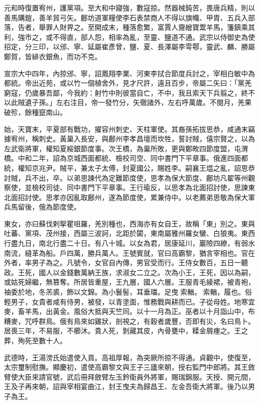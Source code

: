 \begin{pinyinscope}
 元和時復置宥州，護黨項。至大和中寢強，數寇掠。然器械鈍苦，畏唐兵精，則以善馬購鎧，善羊貿弓矢。鄜坊道軍糧使李石表禁商人不得以旗幟、甲胄、五兵入部落，告者，舉罪人財畀之。至開成末，種落愈繁，富賈人齎繒寶鬻羊馬，籓鎮乘其利，強市之，或不得直，部人怨，相率為亂，至靈、鹽道不通。武宗以侍御史為使招定，分三印，以邠、寧、延屬崔彥曾，鹽、夏、長澤屬李雩鄠，靈武、麟、勝屬鄭賀，皆緋衣銀魚，而功不克。



 宣宗大中四年，內掠邠、寧，詔鳳翔李業、河東李拭合節度兵討之，宰相白敏中為都統。帝出近苑，或以竹一個植舍外，見才尺許，遠且百步，帝屬二矢曰：「黨羌窮寇，仍歲暴吾鄙，今我約：射竹中則彼當自亡，不中，我且索天下兵翦之，終不以此賊遺子孫。」左右注目，帝一發竹分，矢徹諸外，左右呼萬歲。不閱月，羌果破殄，餘種竄南山。



 始，天寶末，平夏部有戰功，擢容州刺史、天柱軍使。其裔孫拓拔思恭，咸通末竊據宥州，稱刺史。黃巢入長安，與鄜州李孝昌壇而坎牲，誓討賊，僖宗賢之，以為左武衛將軍，權知夏綏銀節度事。次王橋，為巢所敗，更與鄭畋四節度盟，屯渭橋。中和二年，詔為京城西面都統、檢校司空、同中書門下平章事。俄進四面都統，權知京兆尹。賊平，兼太子太傅，封夏國公，賜姓李。嗣襄王煴之亂，詔思恭討賊，兵不出，卒。以弟思諫代為定難節度使，思孝為保大節度、鄜坊凡翟等州觀察使，並檢校司徒、同中書門下平章事。王行瑜反，以思孝為北面招討使，思諫東北面招討使。思孝亦因亂取鄜州，遂為節度使，累兼侍中。以老薦弟思敬為保大軍兵馬留後，俄為節度使。



 東女，亦曰蘇伐剌挐瞿咀羅，羌別種也，西海亦有女自王，故稱「東」別之。東與吐蕃、黨項、茂州接，西屬三波訶，北距於闐，東南屬雅州羅女蠻、白狼夷。東西行盡九日，南北行盡二十日。有八十城。以女為君，居康延川，巖險四繚，有弱水南流，縫革為船。戶四萬，勝兵萬人。王號賓就，官曰高霸黎，猶言宰相也。官在外者，率男子為之。凡號令，女官自內傳，男官受而行。王侍女數百，五日一聽政。王死，國人以金錢數萬納王族，求淑女二立之。次為小王，王死，因以為嗣，或姑死婦繼，無篡奪。所居皆重屋，王九層，國人六層。王服青毛綾裙，被青袍，袖委於地，冬羔裘，飾以文錦。為小鬟髻，耳垂璫。足曳索輶。索輶，履也。俗輕男子，女貴者咸有侍男，被發，以青塗面，惟務戰與耕而已。子從母姓。地寒宜麥，畜羊馬，出黃金。風俗大抵與天竺同。以十一月為正。巫者以十月詣山中，布糟麥，咒呼群鳥。俄有鳥來如雞狀，剖視之，有穀者歲豐，否即有災，名曰鳥卜。居喪三年，不易服，不櫛沐。貴人死，剝藏其皮，內骨甕中，糅金屑瘞之。王之葬，殉死至數十人。



 武德時，王湯滂氏始遣使入貢。高祖厚報，為突厥所掠不得通。貞觀中，使復至，太宗璽制慰撫。顯慶初，遣使高霸黎文與王子三廬來朝，授右監門中郎將。其王斂臂使大臣來請官號，武后冊拜斂臂左玉鈐衛員外將軍，賜瑞錦服。天授、開元間，王及子再來朝，詔與宰相宴曲江，封王曳夫為歸昌王、左金吾衛大將軍。後乃以男子為王。




\end{pinyinscope}

